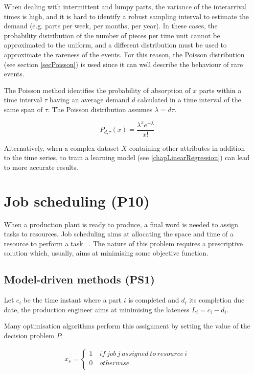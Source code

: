 When dealing with intermittent and lumpy parts, the variance of the interarrival times is high, and it is hard to identify a robust sampling interval to estimate the demand (e.g. parts per week, per months, per year). In these cases, the probability distribution of the number of pieces per time unit cannot be approximated to the uniform, and a different distribution must be used to approximate the rareness of the events. For this reason, the Poisson distribution (see section \ref{secPoisson}) is used since it can well describe the behaviour of rare events.\par

The Poisson method identifies the probability of absorption of $x$ parts within a time interval $\tau$ having an average demand $d$ calculated in a time interval of the same span of $\tau$. The Poisson distribution assumes $\lambda=d\tau$.

\begin{equation}
    P_{d,\tau}\left(x\right)=\frac{\lambda^xe^{-\lambda}}{x!}
\end{equation}

Alternatively, when a complex dataset $X$ containing other attributes in addition to the time series, to train a learning model (see \ref{chapLinearRegression}) can lead to more accurate results.

\section{Job scheduling (P10)} \label{secJobScheduling}
When a production plant is ready to produce, a final word is needed to assign tasks to resources. Job scheduling aims at allocating the space and time of a resource to perform a task ~\cite{Lim2014}. The nature of this problem requires a prescriptive solution which, usually, aims at minimising some objective function.

\subsection{Model-driven methods (PS1)}
Let $c_i$ be the time instant where a part $i$ is completed and $d_i$ its completion due date, the production engineer aims at minimising the lateness $L_i=c_i-d_i$.\par

Many optimisation algorithms perform this assignment by setting the value of the decision problem $P$:

\begin{equation}
   \begin{split}
   x_s=\left\{
                \begin{array}{ll}
                  1\ & if\ job\ j\ assigned\ to\ resource\ i\\
                  0 & otherwise\\
                \end{array}
              \right.
   \end{split}
\end{equation}


